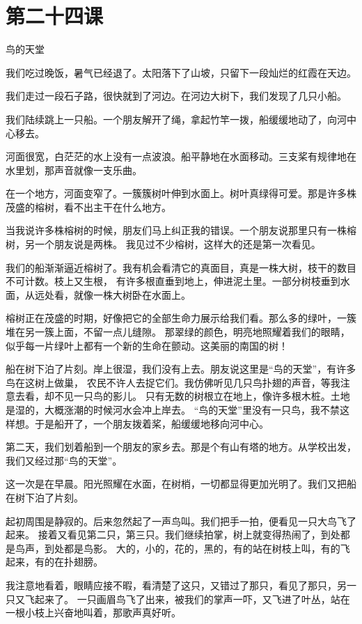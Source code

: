 \documentclass[12pt,UTF8]{ctexbook}
\begin{document}
\section{第二十四课}

鸟的天堂

我们吃过晚饭，暑气已经退了。太阳落下了山坡，只留下一段灿烂的红霞在天边。

我们走过一段石子路，很快就到了河边。在河边大树下，我们发现了几只小船。

我们陆续跳上一只船。一个朋友解开了绳，拿起竹竿一拨，船缓缓地动了，向河中心移去。

河面很宽，白茫茫的水上没有一点波浪。船平静地在水面移动。三支桨有规律地在水里划，那声音就像一支乐曲。

在一个地方，河面变窄了。一簇簇树叶伸到水面上。树叶真绿得可爱。那是许多株茂盛的榕树，看不出主干在什么地方。

当我说许多株榕树的时候，朋友们马上纠正我的错误。一个朋友说那里只有一株榕树，另一个朋友说是两株。
我见过不少榕树，这样大的还是第一次看见。

我们的船渐渐逼近榕树了。我有机会看清它的真面目，真是一株大树，枝干的数目不可计数。枝上又生根，
有许多根直垂到地上，伸进泥土里。一部分树枝垂到水面，从远处看，就像一株大树卧在水面上。

榕树正在茂盛的时期，好像把它的全部生命力展示给我们看。那么多的绿叶，一簇堆在另一簇上面，不留一点儿缝隙。
那翠绿的颜色，明亮地照耀着我们的眼睛，似乎每一片绿叶上都有一个新的生命在颤动。这美丽的南国的树！

船在树下泊了片刻。岸上很湿，我们没有上去。朋友说这里是“鸟的天堂”，有许多鸟在这树上做巢，
农民不许人去捉它们。我仿佛听见几只鸟扑翅的声音，等我注意去看，却不见一只鸟的影儿。
只有无数的树根立在地上，像许多根木桩。土地是湿的，大概涨潮的时候河水会冲上岸去。
“鸟的天堂”里没有一只鸟，我不禁这样想。于是船开了，一个朋友拨着桨，船缓缓地移向河中心。

第二天，我们划着船到一个朋友的家乡去。那是个有山有塔的地方。从学校出发，我们又经过那“鸟的天堂”。

这一次是在早晨。阳光照耀在水面，在树梢，一切都显得更加光明了。我们又把船在树下泊了片刻。

起初周围是静寂的。后来忽然起了一声鸟叫。我们把手一拍，便看见一只大鸟飞了起来。
接着又看见第二只，第三只。我们继续拍掌，树上就变得热闹了，到处都是鸟声，到处都是鸟影。
大的，小的，花的，黑的，有的站在树枝上叫，有的飞起来，有的在扑翅膀。

我注意地看着，眼睛应接不暇，看清楚了这只，又错过了那只，看见了那只，另一只又飞起来了。
一只画眉鸟飞了出来，被我们的掌声一吓，又飞进了叶丛，站在一根小枝上兴奋地叫着，那歌声真好听。
\end{document}
